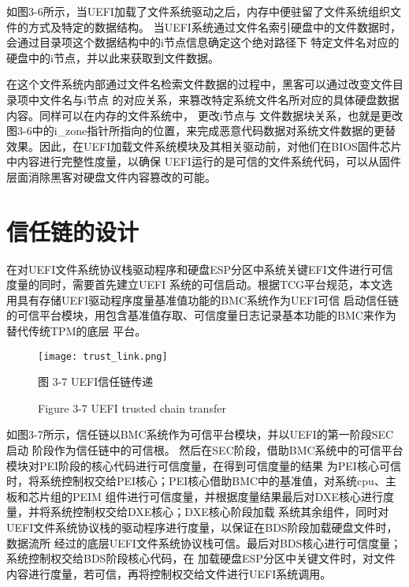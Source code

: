 如图3-6所示，当UEFI加载了文件系统驱动之后，内存中便驻留了文件系统组织文件的方式及特定的数据结构。
当UEFI系统通过文件名索引硬盘中的文件数据时，会通过目录项这个数据结构中的i节点信息确定这个绝对路径下
特定文件名对应的硬盘中的i节点，并以此来获取到文件数据。
\par 在这个文件系统内部通过文件名检索文件数据的过程中，黑客可以通过改变文件目录项中文件名与i节点
的对应关系，来篡改特定系统文件名所对应的具体硬盘数据内容\cite{chinese15}。同样可以在内存的文件系统中，
更改i节点与
文件数据块关系，也就是更改图3-6中的i\_zone指针所指向的位置，来完成恶意代码数据对系统文件数据的更替
效果。因此，在UEFI加载文件系统模块及其相关驱动前，对他们在BIOS固件芯片中内容进行完整性度量，以确保
UEFI运行的是可信的文件系统代码，可以从固件层面消除黑客对硬盘文件内容篡改的可能。

%
%
\section{信任链的设计}
在对UEFI文件系统协议栈驱动程序和硬盘ESP分区中系统关键EFI文件进行可信度量的同时，需要首先建立UEFI
系统的可信启动。根据TCG平台规范，本文选用具有存储UEFI驱动程序度量基准值功能的BMC系统作为UEFI可信
启动信任链的可信平台模块\cite{chinese5}，用包含基准值存取、可信度量日志记录基本功能的BMC来作为替代传统TPM的底层
平台\cite{chinese25}。

\begin{figure}[htb]
    \vspace{0cm}   
    \setlength{\abovecaptionskip}{0.3cm}
	\centering
    \texttt{[image: trust\_link.png]}
    \caption*{图 3-7 UEFI信任链传递}
    \setlength{\belowcaptionskip}{-0.7cm}
    \caption*{Figure 3-7 UEFI trusted chain transfer}
\end{figure}

如图3-7所示，信任链以BMC系统作为可信平台模块\cite{chinese27,chinese28}，并以UEFI的第一阶段SEC启动
阶段作为信任链中的可信根\cite{chinese6}。
然后在SEC阶段，借助BMC系统中的可信平台模块对PEI阶段的核心代码进行可信度量，在得到可信度量的结果
为PEI核心可信时，将系统控制权交给PEI核心；PEI核心借助BMC中的基准值，对系统cpu、主板和芯片组的PEIM
组件进行可信度量，并根据度量结果最后对DXE核心进行度量，并将系统控制权交给DXE核心；DXE核心阶段加载
系统其余组件，同时对UEFI文件系统协议栈的驱动程序进行度量，以保证在BDS阶段加载硬盘文件时，数据流所
经过的底层UEFI文件系统协议栈可信。最后对BDS核心进行可信度量；系统控制权交给BDS阶段核心代码，在
加载硬盘ESP分区中关键文件时，对文件内容进行度量，若可信，再将控制权交给文件进行UEFI系统调用\cite{chinese12}。

